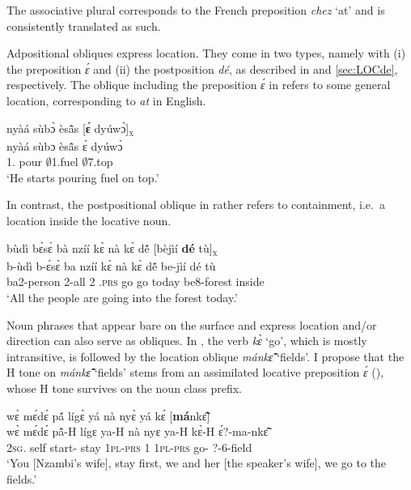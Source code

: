 \noindent The associative plural corresponds to the French preposition {\itshape chez} `at' and is consistently translated as such.



Adpositional obliques express location. They come in two types, namely with (i) the preposition {\itshape ɛ́} and (ii) the postposition {\itshape dé}, as described in  and \ref{sec:LOCde}, respectively. The oblique including the preposition {\itshape ɛ́} in  refers to some general location, corresponding to {\itshape at} in English.

\ea \label{LOBL1}
  \glll nyàá sùbɔ̀ èsã̂s [{\bfseries ɛ́} dyúwɔ̀]\textsubscript{\textsc{x}} \\
        nyàá sùbɔ èsã̂s {\db}ɛ́ dyúwɔ̀ \\
       1.{\INCH} pour $\emptyset$1.fuel {\db}{\LOC} $\emptyset$7.top\\
    \trans `He starts pouring fuel on top.'
\z

\noindent In contrast, the postpositional oblique in  rather refers to containment, i.e.\ a location inside the locative noun.

\ea \label{LOBL2}
  \glll  bùdì bɛ́sɛ̀ bà nzíí kɛ̀ nà kɛ̀ dẽ́ [bèjìí {\bfseries dé} tù]\textsubscript{\textsc{x}} \\
       b-ùdì b-ɛ́sɛ̀ ba nzíí kɛ̀ nà kɛ̀ dẽ́ {\db}be-jìí dé tù \\
         ba2-person 2-all 2 {\PROG}.\textsc{prs} go {\COM} go today {\db}be8-forest {\LOC} inside\\
    \trans `All the people are going into the forest today.'
\z


Noun phrases that appear bare on the surface and express location and/or direction can also serve as obliques. In , the verb {\itshape kɛ̀} `go', which is mostly intransitive, is followed by the location oblique {\itshape mánkɛ̃̂} `fields'. I propose that the H tone on {\itshape mánkɛ̃̂} `fields' stems from an assimilated locative preposition {\itshape ɛ́} (), whose H tone survives on the noun class prefix.


\ea \label{Lobj}
  \glll   wɛ̀ mɛ́dɛ́ pã́ lígɛ̀ yá nà nyɛ̀ yá kɛ́ [{\bfseries má}nkɛ̃̂]\textsubscript{{\OBL}}  \\
         wɛ̀ mɛ́dɛ́ pã̂-H lígɛ ya-H nà nyɛ ya-H kɛ̀-H {\db}ɛ́?-ma-nkɛ̃̂  \\
           2\textsc{sg}.{\SBJ} self start-{\R} stay 1\textsc{pl}-\textsc{prs} {\COM} 1  1\textsc{pl}-\textsc{prs} go-{\R} {\db}{\LOC}?-6-field\\
    \trans `You [Nzambi's wife], stay first, we and her [the speaker's wife], we go to the fields.'
\z

